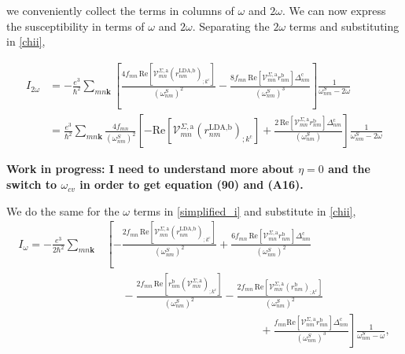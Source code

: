 \documentclass[11pt]{article}
\begin{document}
we conveniently collect the terms in columns of $\omega$ and $2\omega$. We can now express the susceptibility in terms of $\omega$ and $2\omega$. Separating the $2\omega$ terms and substituting in  \eqref{chii}, %

\begin{align}\label{2wchii}
I_{2\omega}
&= -\frac{e^3}{\hbar^2}\sum_{mn\mathbf{k}}\left[\frac{4f_{mn}\,\mathrm{Re}\left[\mathcal{V}^{\Sigma,\text{a}}_{mn}\left(r^{\text{LDA},\text{b}}_{nm}\right)_{;k^{\text{c}}}\right]}{(\omega^{S}_{nm})^{2}} - \frac{8f_{mn}\,\mathrm{Re}\left[\mathcal{V}^{\Sigma,\text{a}}_{mn}r^{\text{b}}_{nm}\right]\Delta^{\text{c}}_{nm}}{(\omega^{S}_{nm})^{3}}\right]\frac{1}{\omega^{S}_{nm}-2\omega}\nonumber\\
&= \frac{e^3}{\hbar^2}\sum_{mn\mathbf{k}}\frac{4f_{mn}}{(\omega^{S}_{nm})^{2}}\left[-\mathrm{Re}\left[\mathcal{V}^{\Sigma,\text{a}}_{mn}\left(r^{\text{LDA},\text{b}}_{nm}\right)_{;k^{\text{c}}}\right] + \frac{2\,\mathrm{Re}\left[\mathcal{V}^{\Sigma,\text{a}}_{mn}r^{\text{b}}_{nm}\right]\Delta^{\text{c}}_{nm}}{(\omega^{S}_{nm})}\right]\frac{1}{\omega^{S}_{nm}-2\omega}
\end{align}

\textbf{Work in progress: I need to understand more about $\eta = 0$ and the switch to $\omega_{cv}$ in order to get equation (90) and (A16).}

We do the same for the $\omega$ terms in \eqref{simplified_i} and substitute in \eqref{chii},
\begin{align}\label{wchii}
I_{\omega}
= -\frac{e^3}{2\hbar^2}\sum_{mn\mathbf{k}}
&\left[
-\frac{2f_{mn}\,\mathrm{Re}\left[\mathcal{V}^{\Sigma,\text{a}}_{mn}\left(r^{\text{LDA},\text{b}}_{nm}\right)_{;k^{\text{c}}}\right]}{(\omega^{S}_{nm})^{2}}
+ \frac{6f_{mn}\,\mathrm{Re}\left[\mathcal{V}^{\Sigma,\text{a}}_{mn}r^{\text{b}}_{nm}\right]\Delta^{\text{c}}_{nm}}{(\omega^{S}_{nm})^{2}}\right.\nonumber\\
&\quad\,\,\,- \left.\frac{2f_{mn}\,\mathrm{Re}\left[r^{\text{b}}_{nm}\left(\mathcal{V}^{\Sigma,\text{a}}_{mn}\right)_{;k^{\text{c}}}\right]}{(\omega^{S}_{nm})^{2}}
- \frac{2f_{mn}\,\mathrm{Re}\left[\mathcal{V}^{\Sigma,\text{a}}_{mn}\left(r^{\text{b}}_{nm}\right)_{;k^{\text{c}}}\right]}{(\omega^{S}_{nm})^{2}}\right.\nonumber\\
&\qquad\qquad\qquad\qquad\qquad\qquad\qquad + \left.\frac{f_{mn}\mathrm{Re}\left[\mathcal{V}^{\Sigma,\text{a}}_{nm}r^{\text{b}}_{mn}\right]\Delta_{nm}^{\text{c}}}{(\omega^{S}_{nm})^{3}}
\right]\frac{1}{\omega^{S}_{nm}-\omega},
\end{align}
\end{document}
